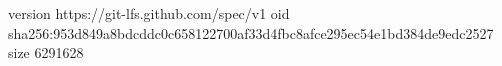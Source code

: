 version https://git-lfs.github.com/spec/v1
oid sha256:953d849a8bdcddc0c658122700af33d4fbc8afce295ec54e1bd384de9edc2527
size 6291628
